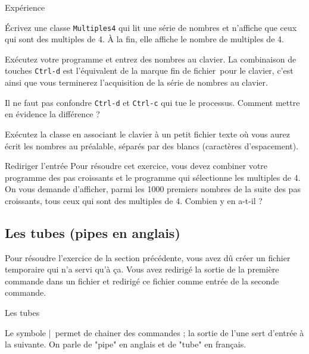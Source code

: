 \documentclass[a4paper,11pt]{article}
\begin{document}
		\begin{Tutoriel}{Exp\'erience} 
				\begin{steps}
					\item Écrivez une classe \verb_Multiples4_ qui lit une série de nombres et n'affiche que ceux qui sont des multiples de 4. 
					À la fin, elle affiche le nombre de multiples de 4.
			
					\item Exécutez votre programme et entrez des nombres au
						clavier.  La combinaison de touches \verb_Ctrl-d_ est
						l'\'equivalent de la marque \og fin de
						fichier\fg\,  pour le clavier, c'est ainsi que
						vous terminerez l'acquisition de la s\'erie de nombres
						au clavier.
					
					\item Il ne faut pas confondre \verb_Ctrl-d_ et \verb_Ctrl-c_
						qui tue le processus. Comment mettre en \'evidence la diff\'erence ?
					
					\item Ex\'ecutez la classe en associant le clavier 
						\`a un petit fichier texte o\`u vous aurez \'ecrit les nombres au pr\'ealable,
						s\'epar\'es par des blancs (caractères d'espacement).						
					
				\end{steps}
		\end{Tutoriel}
				
			
		\begin{Exercice}{Rediriger l'entrée} 
			Pour r\'esoudre cet exercice, vous devez combiner votre programme des pas croissants
			et le programme qui s\'electionne les multiples de 4. On vous demande d'afficher,
			parmi les 1000 premiers nombres de la suite des pas croissants, tous ceux qui sont des multiples de 4.
			Combien y en a-t-il ?
		\end{Exercice}
            		
        \subsection{Les tubes (pipes en anglais)}
Pour r\'esoudre l'exercice de la section pr\'ec\'edente, vous avez d\^u cr\'eer un fichier
temporaire qui n'a servi qu'\`a \c ca. Vous avez redirig\'e la sortie de la premi\`ere commande dans un fichier et
redirig\'e ce fichier comme entr\'ee de la seconde commande.
					
			\begin{coltbox}{Les tubes}
		
				Le symbole \guillemotleft |\guillemotright\,  permet de chainer des commandes ; la sortie de l'une sert d'entr\'ee \`a la suivante. 
				On parle de "pipe" en anglais et de "tube" en fran\c cais.
					
			\end{coltbox}
\end{document}
